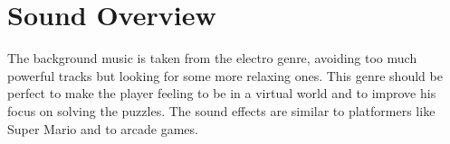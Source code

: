 \documentclass[12pt, a4paper]{report}
\begin{document}
\chapter{Sound Overview}
The background music is taken from the electro genre, avoiding too much powerful tracks but looking for some more relaxing ones. This genre should be perfect to make the player feeling to be in a virtual world and to improve his focus on solving the puzzles. The sound effects are similar to platformers like Super Mario and to arcade games.
\end{document}

